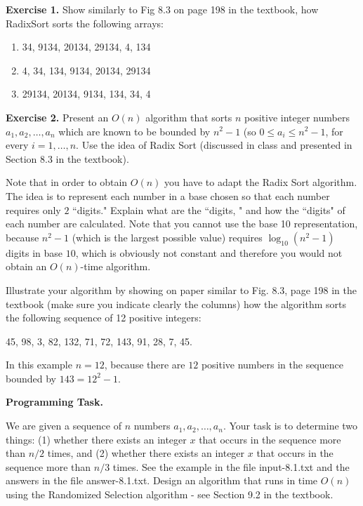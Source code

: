\documentclass[11pt]{article}
\begin{document}

\textbf{Exercise 1.} Show similarly to Fig 8.3 on page 198 in the textbook, how \textsf{RadixSort} sorts the following arrays:
\begin{enumerate}
\item 34, 9134, 20134, 29134, 4, 134
\item 4, 34, 134, 9134, 20134, 29134
\item 29134, 20134, 9134, 134, 34, 4
\end{enumerate}

\textbf{Exercise 2.} Present an $O(n)$ algorithm that sorts $n$ positive integer numbers  $a_1, a_2, \ldots, a_n$ which are known to be bounded by $n^2-1$ (so $0 \leq a_i \leq n^2-1$, for every $i=1, \ldots, n$. Use the idea of Radix Sort  (discussed in class and presented in Section 8.3 in the textbook).

Note that in order to obtain $O(n)$ you have to adapt the Radix Sort algorithm. The idea is to represent each number in a base chosen so that  each number  requires only $2$ ``digits."  Explain what are the ``digits, " and  how the ``digits" of each number are calculated.  Note that you cannot use the base 10 representation, because $n^2-1$ (which is the largest possible value) requires $\log_{10} (n^2-1)$ digits in base $10$, which is obviously not constant and therefore you would not obtain an $O(n)$-time algorithm.

Illustrate your algorithm by showing on paper similar to Fig. 8.3, page 198 in the textbook (make sure you indicate clearly the columns)  how the algorithm sorts the following sequence of 12 positive integers: 

45, 98, 3, 82, 132, 71, 72, 143, 91, 28, 7, 45.

In this example $n=12$, because there are $12$ positive numbers in the sequence bounded by $143 = 12^2 - 1$. 
\bigskip



\textbf{Programming Task.}

We are given a sequence of $n$  numbers $a_1, a_2, \ldots, a_n$. Your task is to determine two things: (1)  whether
there exists an integer $x$ that occurs in the sequence more than $n/2$ times, and (2) whether
there exists an integer $x$ that occurs in the sequence more than $n/3$ times. See the example in the file input-8.1.txt and the answers in the file answer-8.1.txt.   Design an
algorithm that runs in time $O(n)$ using the \textsf{Randomized Selection} algorithm -  see Section 9.2 in the textbook.
\end{document}
